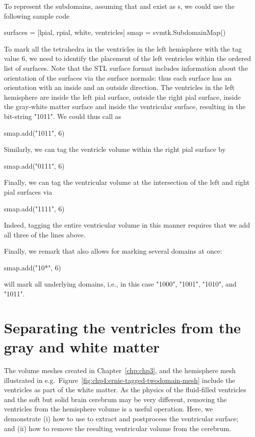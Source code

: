 To represent the subdomains, assuming that  and  exist as
s, we could use the following sample code
\begin{python} 
surfaces = [lpial, rpial, white, ventricles]
smap = svmtk.SubdomainMap()
\end{python}
To mark all the tetrahedra in the ventricles in the left hemisphere
with the tag value 6, we need to identify the placement of the left
ventricles within the ordered list of surfaces. Note that the STL
surface format includes information about the orientation of the
surfaces via the surface normals: thus each surface has an orientation
with an inside and an outside direction. The ventricles in the left
hemisphere are inside the left pial surface, outside the right pial
surface, inside the gray-white matter surface and inside the
ventricular surface, resulting in the bit-string "1011". We could thus
call  as
\begin{python}
smap.add("1011", 6)
\end{python}
Similarly, we can tag the ventricle volume within the right pial
surface by
\begin{python}
smap.add("0111", 6)
\end{python}
Finally, we can tag the ventricular volume at the intersection of the
left and right pial surfaces via
\begin{python}
smap.add("1111", 6)
\end{python}
Indeed, tagging the entire ventricular volume in this manner requires that we add all
three of the lines above.

Finally, we remark that {\svmtk} also allows for marking several
domains at once:
\begin{python}
smap.add("10*", 6)
\end{python}
will mark all underlying domains, i.e., in this case "1000", "1001", "1010", and "1011".   

\section{Separating the ventricles from the gray and white matter}
\label{sec:chp4:tools:remove-vent}

The volume meshes created in Chapter~\ref{chp:chp3}, and the
hemisphere mesh illustrated in
e.g.~Figure~\ref{fig:chp4:ernie-tagged-twodomain-mesh} include the
ventricles as part of the white matter. As the physics of the
fluid-filled ventricles and the soft but solid brain cerebrum may be
very different, removing the ventricles from the hemisphere volume is
a useful operation. Here, we demonstrate (i) how to use {\freesurfer}
to extract and postprocess the ventricular surface; and (ii) how to
remove the resulting ventricular volume from the cerebrum.

